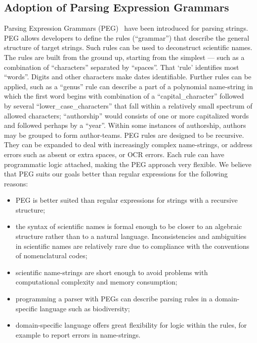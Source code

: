\documentclass{bmcart}
\begin{document}
\subsection*{Adoption of Parsing Expression Grammars}

Parsing Expression Grammars (PEG)~\cite{Ford2004} have been introduced for parsing strings. PEG allows developers to define the rules (``grammar'') that describe the general structure of target strings. Such rules can be used to deconstruct scientific names. The rules are built from the ground up, starting from the simplest --- such as a combination of ``characters'' separated by ``spaces''. That `rule' identifies most ``words''. Digits and other characters make dates identifiable.  Further rules can be applied, such as a ``genus'' rule can describe a part of a polynomial name-string in which the first word begins with combination of a ``capital\_character'' followed by several ``lower\_case\_characters'' that fall within a relatively small spectrum of allowed characters; ``authorship'' would consists of one or more capitalized words and followed perhaps by a ``year''. Within some instances of authorship,  authors may be grouped to form author-teams. PEG rules are designed to be recursive. They can be expanded to deal with increasingly complex name-strings, or address errors such as absent or extra spaces, or OCR errors. Each rule can have programmatic logic attached, making the PEG approach very flexible. We believe that PEG suits our goals better than regular expressions for the following reasons:

\begin{itemize}

  \item PEG is better suited than regular expressions for strings with a recursive structure;

  \item the syntax of scientific names is formal enough to be closer to an algebraic structure rather than to a natural language. Inconsistencies and ambiguities in scientific names are relatively rare due to compliance with the conventions of nomenclatural codes;

  \item scientific name-strings are short enough to avoid problems with computational complexity and memory consumption;

  \item programming a parser with PEGs can describe parsing rules in a domain-specific language such as biodiversity;

  \item domain-specific language offers great flexibility for logic within the rules, for example to report errors in name-strings.

\end{itemize}
\end{document}
